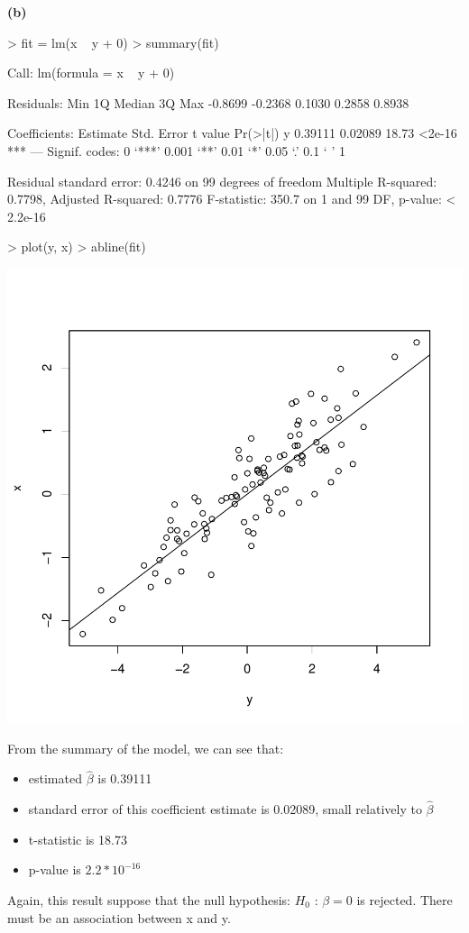 \documentclass[a4paper]{article}
\renewcommand{\part}[1] {\vspace{.10in} {\bf (#1)}}
\begin{document}
\part{b}
\begin{Schunk}
\begin{Sinput}
> fit = lm(x ~ y + 0)
> summary(fit)
\end{Sinput}
\begin{Soutput}
Call:
lm(formula = x ~ y + 0)

Residuals:
    Min      1Q  Median      3Q     Max 
-0.8699 -0.2368  0.1030  0.2858  0.8938 

Coefficients:
  Estimate Std. Error t value Pr(>|t|)    
y  0.39111    0.02089   18.73   <2e-16 ***
---
Signif. codes:  0 ‘***’ 0.001 ‘**’ 0.01 ‘*’ 0.05 ‘.’ 0.1 ‘ ’ 1

Residual standard error: 0.4246 on 99 degrees of freedom
Multiple R-squared:  0.7798,	Adjusted R-squared:  0.7776 
F-statistic: 350.7 on 1 and 99 DF,  p-value: < 2.2e-16
\end{Soutput}
\begin{Sinput}
> plot(y, x)
> abline(fit)
\end{Sinput}
\end{Schunk}
\includegraphics{lm-b}

\begin{enumerate}
{\color{red}
\item From the summary of the model, we can see that:
\begin{itemize}
\item estimated $\hat{\beta}$ is 0.39111
\item standard error of this coefficient estimate is 0.02089, small relatively to $\hat{\beta}$
\item t-statistic is 18.73
\item p-value is $2.2 * 10^{-16}$
\end{itemize}
Again, this result suppose that the null hypothesis: $H_0$ : $\beta = 0$ is rejected. There must be an association between x and y.
}
\end{enumerate}
\end{document}
